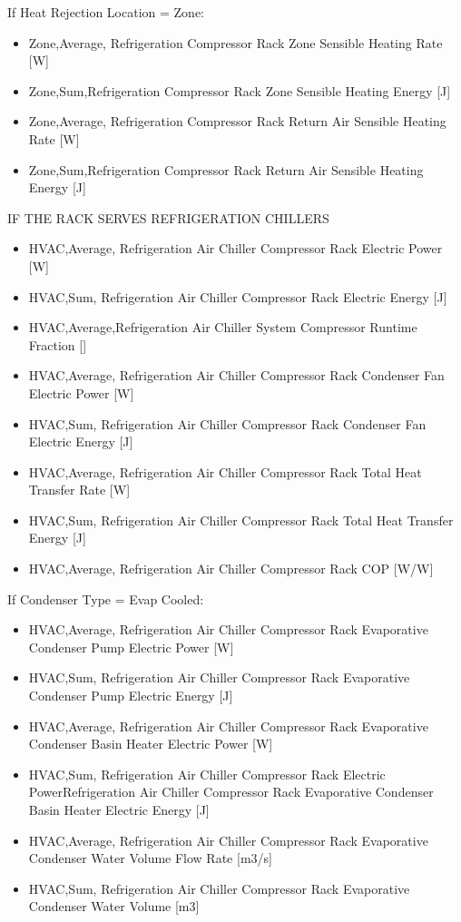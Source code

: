 If Heat Rejection Location = Zone:

\begin{itemize}
\item
  Zone,Average, Refrigeration Compressor Rack Zone Sensible Heating Rate {[}W{]}
\item
  Zone,Sum,Refrigeration Compressor Rack Zone Sensible Heating Energy {[}J{]}
\item
  Zone,Average, Refrigeration Compressor Rack Return Air Sensible Heating Rate {[}W{]}
\item
  Zone,Sum,Refrigeration Compressor Rack Return Air Sensible Heating Energy {[}J{]}
\end{itemize}

IF THE RACK SERVES REFRIGERATION CHILLERS

\begin{itemize}
\item
  HVAC,Average, Refrigeration Air Chiller Compressor Rack Electric Power {[}W{]}
\item
  HVAC,Sum, Refrigeration Air Chiller Compressor Rack Electric Energy {[}J{]}
\item
  HVAC,Average,Refrigeration Air Chiller System Compressor Runtime Fraction {[]}
\item
  HVAC,Average, Refrigeration Air Chiller Compressor Rack Condenser Fan Electric Power {[}W{]}
\item
  HVAC,Sum, Refrigeration Air Chiller Compressor Rack Condenser Fan Electric Energy {[}J{]}
\item
  HVAC,Average, Refrigeration Air Chiller Compressor Rack Total Heat Transfer Rate {[}W{]}
\item
  HVAC,Sum, Refrigeration Air Chiller Compressor Rack Total Heat Transfer Energy {[}J{]}
\item
  HVAC,Average, Refrigeration Air Chiller Compressor Rack COP {[}W/W{]}
\end{itemize}

If Condenser Type = Evap Cooled:

\begin{itemize}
\item
  HVAC,Average, Refrigeration Air Chiller Compressor Rack Evaporative Condenser Pump Electric Power {[}W{]}
\item
  HVAC,Sum, Refrigeration Air Chiller Compressor Rack Evaporative Condenser Pump Electric Energy {[}J{]}
\item
  HVAC,Average, Refrigeration Air Chiller Compressor Rack Evaporative Condenser Basin Heater Electric Power {[}W{]}
\item
  HVAC,Sum, Refrigeration Air Chiller Compressor Rack Electric PowerRefrigeration Air Chiller Compressor Rack Evaporative Condenser Basin Heater Electric Energy {[}J{]}
\item
  HVAC,Average, Refrigeration Air Chiller Compressor Rack Evaporative Condenser Water Volume Flow Rate {[}m3/s{]}
\item
  HVAC,Sum, Refrigeration Air Chiller Compressor Rack Evaporative Condenser Water Volume {[}m3{]}
\end{itemize}


